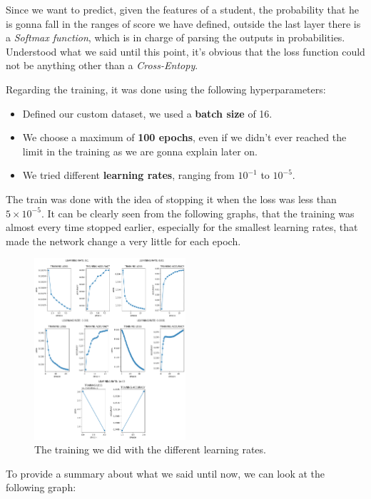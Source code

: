 \documentclass{article}
\begin{document}
Since we want to predict, given the features of a student, the probability that he is gonna fall in the ranges of score we have defined, outside the last layer there is a \emph{Softmax function}, which is in charge
of parsing the outputs in probabilities. 
Understood what we said until this point, it's obvious that the loss function could not be anything other than a \emph{Cross-Entopy}.

Regarding the training, it was done using the following hyperparameters:

\begin{itemize}
    \item Defined our custom dataset, we used a \textbf{batch size} of 16.
    \item We choose a maximum of \textbf{100 epochs}, even if we didn't ever reached the limit in the training as we are gonna explain later on.
    \item We tried different \textbf{learning rates}, ranging from $10^{-1}$ to $10^{-5}$.
\end{itemize}

The train was done with the idea of stopping it when the loss was less than $5 \times 10^{-5}$. It can be clearly seen from the following graphs, that the training was almost every time stopped earlier,
especially for the smallest learning rates, that made the network change a very little for each epoch.

\begin{figure}
    \centering
    \includegraphics[width=0.5\textwidth]{lr_training.png}
    \caption{\label{fig:lr}The training we did with the different learning rates.}
\end{figure}

To provide a summary about what we said until now, we can look at the following graph:
\end{document}

